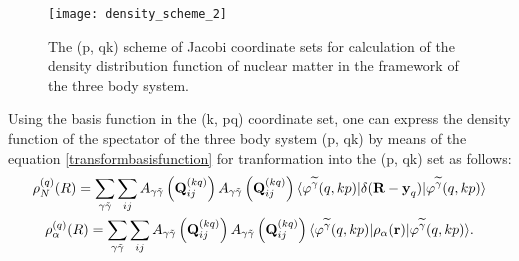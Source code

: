 \documentclass[
12pt, %
oneside, %
english, %
onehalfspacing, %
onehalfspacing, %
headsepline, %
]{MastersDoctoralThesis} %
\begin{document}
\begin{figure}[t]
\centering
\texttt{[image: density\_scheme\_2]}
\decoRule
\caption{\footnotesize The (p, qk) scheme of Jacobi coordinate sets for calculation of the density distribution function of nuclear matter in the framework of  the three body system. }
\label{fig:density_scheme_2}
\end{figure}


Using the basis function in the (k, pq) coordinate set, one can express the density function of the spectator of the three body system (p, qk) by means of the  equation \eqref{transformbasisfunction} for tranformation into the (p, qk) set as follows: 
\begin{align*}
\begin{gathered}
\rho_{N}^{(q)}({R})=
\sum_{\gamma \tilde{\gamma}}
\sum_{ij}
A_{\gamma\tilde{\gamma}}\left( {\bf Q}_{ij}^{(kq)} \right)
A_{\gamma\tilde{\gamma}}\left( {\bf Q}_{ij}^{(kq)} \right)
\langle \varphi^{ \widetilde{\gamma} }(q,kp) 
\vert \delta(\textbf{R}-\textbf{y}_q)
\vert \varphi^{\widetilde{\gamma}}(q,kp)\rangle \\
\rho_{\alpha}^{(q)}({R})= 
\sum_{\gamma \tilde{\gamma}}
\sum_{ij}
A_{\gamma\tilde{\gamma}}\left( {\bf Q}_{ij}^{(kq)} \right)
A_{\gamma\tilde{\gamma}}\left( {\bf Q}_{ij}^{(kq)} \right)
\langle \varphi^{ \widetilde{\gamma} }(q,kp)
\vert \rho_{\alpha}(\textbf{r})
\vert \varphi^{\widetilde{\gamma}}(q,kp)\rangle.\\
\end{gathered}
\end{align*}
\end{document}
